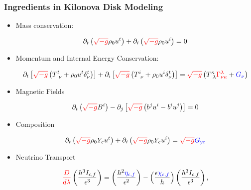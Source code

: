 \documentclass[]{beamer}
\newcommand{\paren}[1]{\left( #1 \right)}
\newcommand{\sqrbrace}[1]{\left[ #1 \right]}
\newcommand{\detg}{\sqrt{-g}}
\newcommand{\eepsilon}{\epsilon} %
\newcommand{\etanuf}{\eta_{\eepsilon,f}}
\newcommand{\Inuf}{I_{\eepsilon,f}}
\newcommand{\chinuf}{\chi_{\eepsilon,f}}
\begin{document}
\begin{frame}
  \frametitle{Ingredients in Kilonova Disk Modeling}
  \begin{itemize}
  \item Mass conservation:
    \begin{small}
      \begin{displaymath}
        \partial_t \paren{{\color{red}\detg}\rho_0 u^t}
        + \partial_i\paren{{\color{red}\detg}\rho_0u^i} = 0
      \end{displaymath}
    \end{small}
  \item Momentum and Internal Energy Conservation:
    \begin{small}
      \begin{displaymath}
        \partial_t\sqrbrace{{\color{red}\detg} \paren{T^t_{\ \nu} + \rho_0u^t \delta^t_\nu}}
        + \partial_i\sqrbrace{{\color{red}\detg}\paren{T^i_{\ \nu} + \rho_0 u^i \delta^t_\nu}}
        = {\color{red}\detg} \paren{T^\kappa_{\ \lambda} {\color{red}\Gamma^\lambda_{\nu\kappa}} + {\color{blue}G_\nu}}
      \end{displaymath}
    \end{small}
  \item Magnetic Fields
    \begin{small}
      \begin{displaymath}
        \partial_t \paren{{\color{red}\detg} B^i}
        - \partial_j \sqrbrace{{\color{red}\detg}\paren{b^ju^i - b^i u^j}}
        = 0
      \end{displaymath}
    \end{small}
  \item Composition
    \begin{small}
      \begin{displaymath}
        \partial_t\paren{{\color{red}\detg}\rho_0 Y_e u^t}
        + \partial_i\paren{{\color{red}\detg}\rho_0Y_eu^i}
        = {\color{red}\detg} {\color{blue}G_{\text{ye}}}
      \end{displaymath}
    \end{small}
  \item Neutrino Transport
    \begin{small}
      \begin{displaymath}
        {\color{red}\frac{D}{d\lambda}}\paren{\frac{h^3\Inuf}{\eepsilon^3}}
        = \paren{\frac{h^2{\color{blue}\etanuf}}{\eepsilon^2}}
        - \paren{\frac{\eepsilon {\color{blue}\chinuf}}{h}} \paren{\frac{h^3\Inuf}{\eepsilon^3}},
      \end{displaymath}
    \end{small}
  \end{itemize}
\end{frame}
\end{document}

